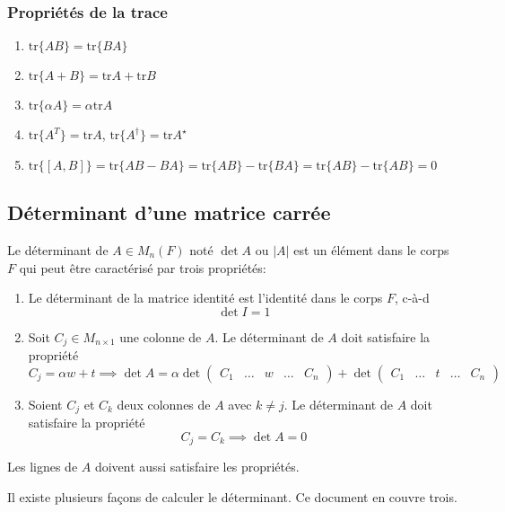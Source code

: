 \subsubsection{Propriétés de la trace}
\begin{enumerate}
    \item $\text{tr}\{ AB \} = \text{tr}\{ BA \}$
    \item $\text{tr}\{ A + B \} = \text{tr}A + \text{tr}B$
    \item $\text{tr}\{ \alpha A \} = \alpha \text{tr}A $
    \item $\text{tr}\{ A^T \} = \text{tr}A$, $\text{tr}\{ A^\dagger \} = \text{tr}A^\star$
    \item $\text{tr}\{ [A, B] \} = \text{tr}\{ AB - BA \} = \text{tr}\{ AB \} - \text{tr}\{BA\} = \text{tr}\{ AB \} - \text{tr}\{AB\} = 0$
\end{enumerate}

\subsection{Déterminant d'une matrice carrée}
\begin{definition}
    \label{definition_determinant}
    Le déterminant de $A \in M_{n}(F)$ noté $\det A$ ou $|A|$ est un élément dans le corps $F$ qui peut être caractérisé par trois propriétés:
    \begin{enumerate}
        \item Le déterminant de la matrice identité est l'identité dans le corps $F$, c-à-d  \[ \det I = 1 \]
        \item Soit $C_j \in M_{n \times 1}$ une colonne de $A$. Le déterminant de $A$ doit satisfaire la propriété
              \[ C_j = \alpha w + t \implies \det A = \alpha \det \begin{pmatrix}
                      C_1 & \ldots & w & \ldots & C_n
                  \end{pmatrix} + \det \begin{pmatrix}
                      C_1 & \ldots & t & \ldots & C_n
                  \end{pmatrix} \]
        \item Soient $C_j$ et $C_k$ deux colonnes de $A$ avec $k \neq j$. Le déterminant de $A$ doit satisfaire la propriété
              \[ C_j = C_k \implies \det A = 0 \]
    \end{enumerate}
\end{definition}
\begin{note}
    Les lignes de $A$ doivent aussi satisfaire les propriétés.
\end{note}
Il existe plusieurs façons de calculer le déterminant. Ce document en couvre trois.

